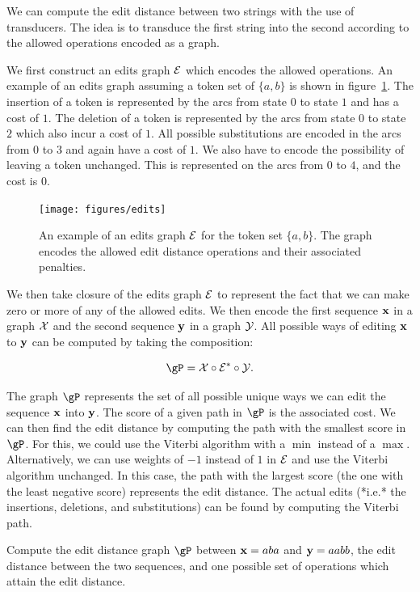 We can compute the edit distance between two strings with the use of
transducers. The idea is to transduce the first string into the second
according to the allowed operations encoded as a graph.

We first construct an edits graph $\mathcal{E}$ which encodes the allowed operations.
An example of an edits graph assuming a token set of $\{a, b\}$ is shown in
figure~\ref{fig:edits}.  The insertion of a token is represented by the arcs
from state $0$ to state $1$ and has a cost of $1$. The deletion of a token is
represented by the arcs from state $0$ to state $2$ which also incur a cost of
$1$. All possible substitutions are encoded in the arcs from $0$ to $3$ and
again have a cost of $1$. We also have to encode the possibility of leaving a
token unchanged. This is represented on the arcs from $0$ to $4$, and the cost
is $0$.

\begin{figure}
    \centering
    \texttt{[image: figures/edits]}
    \caption{An example of an edits graph $\mathcal{E}$ for the token set $\{a, b\}$.
    The graph encodes the allowed edit distance operations and their associated
    penalties.}
    \label{fig:edits}
\end{figure}

We then take closure of the edits graph $\mathcal{E}$ to represent the fact that we can
make zero or more of any of the allowed edits. We then encode the first
sequence ${\bf x}$ in a graph $\mathcal{X}$ and the second sequence ${\bf y}$ in a graph $\mathcal{Y}$.
All possible ways of editing ${\bf x}$ to ${\bf y}$ can be computed by taking the
composition:

$$
\gP = \gX \circ \gE^* \circ \gY.
$$

The graph $\gP$ represents the set of all possible unique ways we can edit the
sequence ${\bf x}$ into ${\bf y}$. The score of a given path in $\gP$ is the associated
cost. We can then find the edit distance by computing the path with the
smallest score in $\gP$. For this, we could use the Viterbi algorithm with a
$\min$ instead of a $\max$. Alternatively, we can use weights of $-1$ instead
of $1$ in $\mathcal{E}$ and use the Viterbi algorithm unchanged. In this case, the path
with the largest score (the one with the least negative score) represents the
edit distance. The actual edits (*i.e.* the insertions, deletions, and
substitutions) can be found by computing the Viterbi path.

\begin{example}
Compute the edit distance graph $\gP$ between ${\bf x} = aba$ and ${\bf y} = aabb$, the
edit distance between the two sequences, and one possible set of operations
which attain the edit distance.
\end{example}

